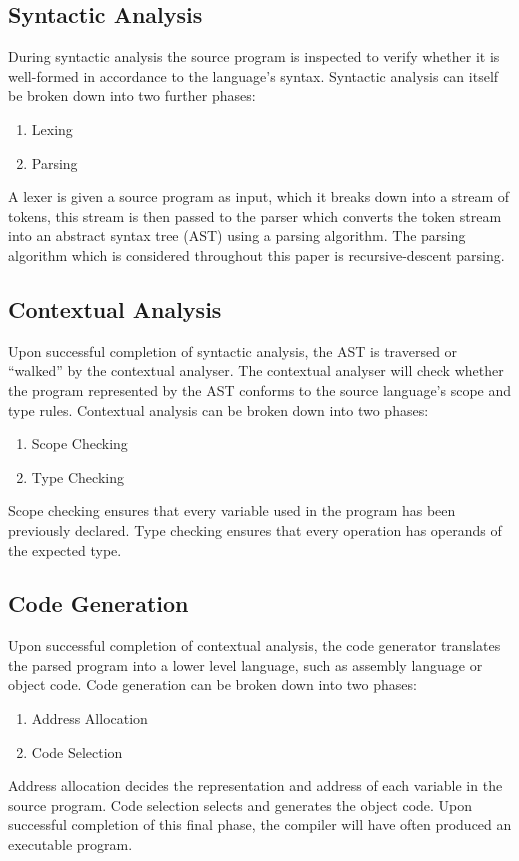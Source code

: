 \documentclass{l4proj}
\begin{document}
\begin{appendices}
\subsection{Syntactic Analysis}
During syntactic analysis the source program is inspected to verify whether it is well-formed in accordance to the language's syntax. Syntactic analysis can itself be broken down into two further phases:
\begin{enumerate}
\item Lexing
\item Parsing
\end{enumerate}

A lexer is given a source program as input, which it breaks down into a stream of tokens, this stream is then passed to the parser which converts the token stream into an abstract syntax tree (AST) using a parsing algorithm. The parsing algorithm which is considered throughout this paper is recursive-descent parsing.

\subsection{Contextual Analysis}
Upon successful completion of syntactic analysis, the AST is traversed or ``walked'' by the contextual analyser. The contextual analyser will check whether the program represented by the AST conforms to the source language's scope and type rules. Contextual analysis can be broken down into two phases:
\begin{enumerate}
\item Scope Checking
\item Type Checking
\end{enumerate}

Scope checking ensures that every variable used in the program has been previously declared. Type checking ensures that every operation has operands of the expected type.

\subsection{Code Generation}
Upon successful completion of contextual analysis, the code generator translates the parsed program into a lower level language, such as assembly language or object code. Code generation can be broken down into two phases:
\begin{enumerate}
\item Address Allocation
\item Code Selection
\end{enumerate}

Address allocation decides the representation and address of each variable in the source program. Code selection selects and generates the object code. Upon successful completion of this final phase, the compiler will have often produced an executable program.
\end{appendices}



%
\end{document}

